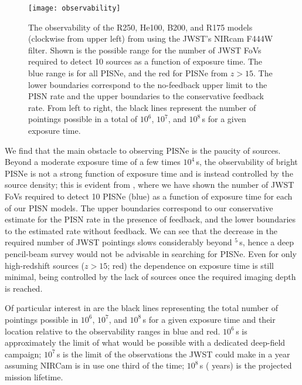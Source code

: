 \documentclass[../thesis.tex]{subfiles}
\begin{document}
\begin{figure}
\begin{center}
  \texttt{[image: observability]}
  \caption{The observability of the R250, He100, B200,
    and R175 models (clockwise from upper left) from
    \citet{KasenWoosleyHeger2011} using the JWST's NIRcam F444W
    filter. Shown is the possible range for the number of JWST FoVs
    required to detect 10 sources as a function of exposure time. The
    blue range is for all PISNe, and the red for PISNe
    from $z>15$.  The lower boundaries correspond to the
    no-feedback upper limit to the PISN rate and the upper boundaries to
    the conservative feedback rate.  From left to right, the black
    lines represent the number of pointings possible in a total of
    $10^6$, $10^7$, and $10^8\,$s for a given exposure time.}
  \label{observability}
\end{center}
\end{figure}

We find that the main obstacle to observing PISNe is the paucity of
sources.  Beyond a moderate exposure time of a few times $10^4\,$s,
the observability of bright PISNe is not a strong function of exposure
time and is instead controlled by the source density; this is evident
from , where we have shown the number of JWST
FoVs required to detect 10 PISNe (blue) as a function of exposure time
for each of our PISN models.  The upper boundaries correspond to our
conservative estimate for the PISN rate in the presence of feedback,
and the lower boundaries to the estimated rate without feedback. We can
see that the decrease in the required number of JWST pointings slows
considerably beyond $^5\,$s, hence a deep pencil-beam survey
would not be advisable in searching for PISNe. Even for only
high-redshift sources ($z>15$; red) the dependence on exposure time is
still minimal, being controlled by the lack of sources once the
required imaging depth is reached.

Of particular interest in  are the black lines
representing the total number of pointings possible in $10^6$, $10^7$,
and $10^8\,$s for a given exposure time and their location relative to
the observability ranges in blue and red.  $10^6\,$s is approximately
the limit of what would be possible with a dedicated deep-field
campaign; $10^7\,$s is the limit of the observations the JWST could
make in a year assuming NIRCam is in use one third of the time;
$10^8\,$s ( years) is the projected mission lifetime. 
\end{document}
